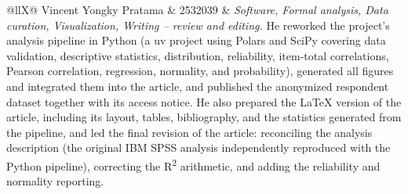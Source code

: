 \begin{xltabular}{\linewidth}{@{}llX@{}}
  Vincent Yongky Pratama & 2532039 & \textit{Software, Formal analysis, Data curation, Visualization, Writing -- review and editing.} He reworked the project's analysis pipeline in Python (a uv project using Polars and SciPy covering data validation, descriptive statistics, distribution, reliability, item-total correlations, Pearson correlation, regression, normality, and probability), generated all figures and integrated them into the article, and published the anonymized respondent dataset together with its access notice. He also prepared the LaTeX version of the article, including its layout, tables, bibliography, and the statistics generated from the pipeline, and led the final revision of the article: reconciling the analysis description (the original IBM SPSS analysis independently reproduced with the Python pipeline), correcting the R\textsuperscript{2} arithmetic, and adding the reliability and normality reporting. \\
\end{xltabular}
